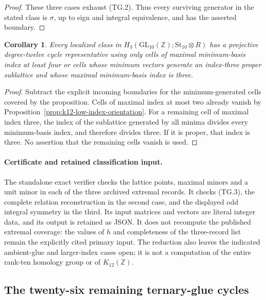 \documentclass[11pt,a4paper]{article}
\newtheorem{corollary}[theorem]{Corollary}
\theoremstyle{definition}
\begin{document}
\begin{proof}
These three cases exhaust (TG.2). Thus every surviving generator
in the stated class is $\sigma$, up to sign and integral
equivalence, and has the asserted boundary.
\end{proof}

\begin{corollary}
Every localized class in
$H_3(\mathrm{GL}_{10}(\mathbb Z);\mathrm{St}_{10}\otimes R)$
has a projective degree-twelve cycle representative using only
cells of maximal minimum-basis index at least four or cells
whose minimum vectors generate an index-three proper sublattice
and whose maximal minimum-basis index is three.
\end{corollary}

\begin{proof}
Subtract the explicit incoming boundaries for the
minimum-generated cells covered by the proposition. Cells of
maximal index at most two already vanish by
Proposition~\ref{prop:k12-low-index-orientation}. For a remaining
cell of maximal index three, the index of the sublattice generated
by all minima divides every minimum-basis index, and therefore
divides three. If it is proper, that index is three. No assertion
that the remaining cells vanish is used.
\end{proof}

\paragraph{Certificate and retained classification input.}
The standalone exact verifier
checks the lattice points, maximal minors and a unit minor in
each of the three archived extremal records. It checks (TG.3),
the complete relation reconstruction in the second case, and
the displayed odd integral symmetry in the third. Its input
matrices and vectors are literal integer data, and its output
is retained as JSON. It does not recompute the published
extremal coverage: the values of $h$ and completeness of the
three-record list remain the explicitly cited primary input.
The reduction also leaves the indicated ambient-glue and
larger-index cases open; it is not a computation of the entire
rank-ten homology group or of $K_{12}(\mathbb Z)$.

\subsection{The twenty-six remaining ternary-glue cycles}
\label{subsec:k12-ternary-glue}
\end{document}
